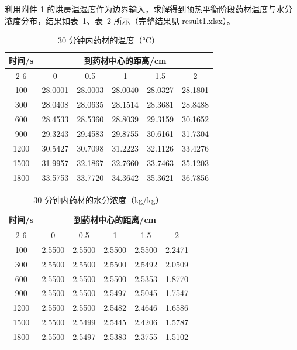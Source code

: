 利用附件 1 的烘房温湿度作为边界输入，求解得到预热平衡阶段药材温度与水分浓度分布，结果如表~\ref{tab:p1-temperature}、表~\ref{tab:p1-moisture} 所示（完整结果见 result1.xlsx）。

\begin{table}[htbp]
	\caption{30 分钟内药材的温度（°C）}
	\label{tab:p1-temperature}
	\centering
	\begin{tabular}{cccccc}
		\toprule
		\multirow{2}{*}{时间/s} & \multicolumn{5}{c}{到药材中心的距离/cm} \\
		\cmidrule(lr){2-6}
		 & 0 & 0.5 & 1 & 1.5 & 2 \\
		\midrule
		100 & 28.0001 & 28.0003 & 28.0040 & 28.0327 & 28.1801 \\
		300 & 28.0408 & 28.0635 & 28.1514 & 28.3681 & 28.8488 \\
		600 & 28.4533 & 28.5360 & 28.8039 & 29.3159 & 30.1652 \\
		900 & 29.3243 & 29.4583 & 29.8755 & 30.6161 & 31.7304 \\
		1200 & 30.5427 & 30.7098 & 31.2223 & 32.1126 & 33.4276 \\
		1500 & 31.9957 & 32.1867 & 32.7660 & 33.7463 & 35.1203 \\
		1800 & 33.5753 & 33.7720 & 34.3642 & 35.3621 & 36.7856 \\
		\bottomrule
	\end{tabular}
\end{table}

\begin{table}[htbp]
	\caption{30 分钟内药材的水分浓度（kg/kg）}
	\label{tab:p1-moisture}
	\centering
	\begin{tabular}{cccccc}
		\toprule
		\multirow{2}{*}{时间/s} & \multicolumn{5}{c}{到药材中心的距离/cm} \\
		\cmidrule(lr){2-6}
		 & 0 & 0.5 & 1 & 1.5 & 2 \\
		\midrule
		100 & 2.5500 & 2.5500 & 2.5500 & 2.5500 & 2.2471 \\
		300 & 2.5500 & 2.5500 & 2.5500 & 2.5492 & 2.0509 \\
		600 & 2.5500 & 2.5500 & 2.5500 & 2.5353 & 1.8770 \\
		900 & 2.5500 & 2.5500 & 2.5497 & 2.5045 & 1.7547 \\
		1200 & 2.5500 & 2.5500 & 2.5482 & 2.4646 & 1.6586 \\
		1500 & 2.5500 & 2.5499 & 2.5445 & 2.4206 & 1.5787 \\
		1800 & 2.5500 & 2.5497 & 2.5383 & 2.3755 & 1.5102 \\
		\bottomrule
	\end{tabular}
\end{table}


